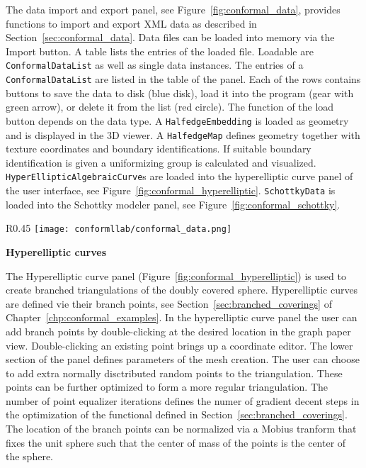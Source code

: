 \documentclass[Thesis.tex]{subfiles}
\begin{document}
The data import and export panel, see Figure~\ref{fig:conformal_data},
provides functions to import and export XML data as described in Section~\ref{sec:conformal_data}.
Data files can be loaded into memory via the Import button. A table lists the entries of the loaded file.
Loadable are {\tt ConformalDataList} as well as single data instances. The entries of a
{\tt ConformalDataList} are listed in the table of the panel. Each of the rows contains buttons
to save the data to disk (blue disk), load it into the program (gear with green arrow), or delete 
it from the list (red circle).
The function of the load button depends on the data type. A {\tt HalfedgeEmbedding} is
loaded as geometry and is displayed in the 3D viewer. A {\tt HalfedgeMap} defines geometry 
together with texture coordinates and boundary identifications. If suitable boundary identification is given a uniformizing
group is calculated and visualized. {\tt HyperEllipticAlgebraicCurve}s are loaded into 
the hyperelliptic curve panel of the user interface, see Figure~\ref{fig:conformal_hyperelliptic}. 
{\tt SchottkyData} is loaded into the Schottky modeler panel, see Figure~\ref{fig:conformal_schottky}.

\begin{wrapfigure}{R}{0.45\textwidth}
\centering
\texttt{[image: conformllab/conformal\_data.png]}
\caption{XML data import and export interface of {\sc ConformalLab}.}
\label{fig:conformal_data}
\end{wrapfigure}

{\bf Hyperelliptic curves}

The Hyperelliptic curve panel (Figure~\ref{fig:conformal_hyperelliptic}) is used to create branched 
triangulations of the doubly covered sphere.
Hyperelliptic curves are defined vie their branch points, see Section~\ref{sec:branched_coverings} of Chapter~\ref{chp:conformal_examples}.
In the hyperelliptic curve panel the user can add branch points by double-clicking at the desired location in
the graph paper view. Double-clicking an existing point brings up a coordinate editor. The lower section
of the panel defines parameters of the mesh creation. The user can choose to add extra normally disctributed random points to the triangulation. These points can be further optimized to form a more regular triangulation.
The number of point equalizer iterations defines the numer of gradient decent steps in the optimization of 
the functional defined in Section~\ref{sec:branched_coverings}. 
The location of the branch points can be normalized via a Mobius tranform that fixes the unit sphere such
that the center of mass of the points is the center of the sphere.
\end{document}
